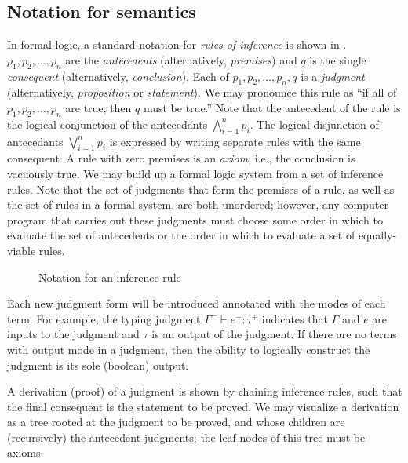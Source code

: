 \subsection{Notation for semantics}
\label{sec:semantics-notation}
In formal logic, a standard notation for \textit{rules of inference} is shown in . $p_1,p_2,\dots,p_n$ are the \textit{antecedents} (alternatively, \textit{premises}) and $q$ is the single \textit{consequent} (alternatively, \textit{conclusion}). Each of $p_1,p_2,\dots,p_n,q$ is a \textit{judgment} (alternatively, \textit{proposition} or \textit{statement}). We may pronounce this rule as ``if all of $p_1,p_2,\dots,p_n$ are true, then $q$ must be true.'' Note that the antecedent of the rule is the logical conjunction of the antecedants $\bigwedge_{i=1}^n p_i$. The logical disjunction of antecedants $\bigvee_{i=1}^n p_i$ is expressed by writing separate rules with the same consequent. A rule with zero premises is an \textit{axiom}, i.e., the conclusion is vacuously true. We may build up a formal logic system from a set of inference rules. Note that the set of judgments that form the premises of a rule, as well as the set of rules in a formal system, are both unordered; however, any computer program that carries out these judgments must choose some order in which to evaluate the set of antecedents or the order in which to evaluate a set of equally-viable rules.

\begin{figure}
  \centering
  \begin{mdframed}
    \begin{singlespace}
      
    \end{singlespace}
  \end{mdframed}
  \caption{Notation for an inference rule}
  \label{fig:sample-inference-rule}
\end{figure}

Each new judgment form will be introduced annotated with the modes of each term. For example, the typing judgment $\Gamma^-\vdash e^-:\tau^+$ indicates that $\Gamma$ and $e$ are inputs to the judgment and $\tau$ is an output of the judgment. If there are no terms with output mode in a judgment, then the ability to logically construct the judgment is its sole (boolean) output.

A derivation (proof) of a judgment is shown by chaining inference rules, such that the final consequent is the statement to be proved. We may visualize a derivation as a tree rooted at the judgment to be proved, and whose children are (recursively) the antecedent judgments; the leaf nodes of this tree must be axioms.

